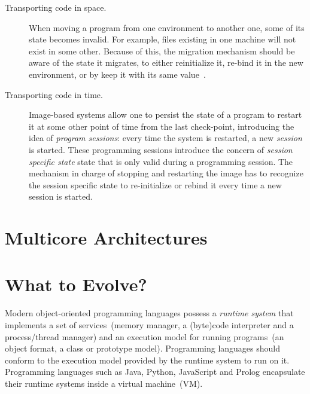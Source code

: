 \begin{description}
\item[Transporting code in space.] When moving a program from one environment to another one, some of its state becomes invalid. For example, files existing in one machine will not exist in some other. Because of this, the migration mechanism should be aware of the state it migrates, to either reinitialize it, re-bind it in the new environment, or by keep it with its same value~\cite{Unga95a}.

\item[Transporting code in time.] Image-based systems allow one to persist the state of a program to restart it at some other point of time from the last check-point, introducing the idea of \emph{program sessions}: every time the system is restarted, a new \emph{session} is started. These programming sessions introduce the concern of \emph{session specific state} \ie state that is only valid during a programming session. The mechanism in charge of stopping and restarting the image has to recognize the session specific state to re-initialize or rebind it every time a new session is started.

\end{description}

\section{Multicore Architectures}


\section{What to Evolve?}

Modern object-oriented programming languages possess a \emph{runtime system} that implements a set of services~(\eg memory manager, a (byte)code interpreter and a process/thread manager) and an execution model for running programs~(\eg an object format, a class or prototype model). Programming languages should conform to the execution model provided by the runtime system to run on it. Programming languages such as Java, Python, JavaScript and Prolog encapsulate their runtime systems inside a virtual machine~(VM).

